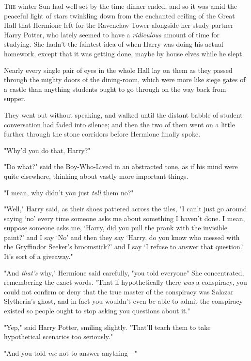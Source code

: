 
\lettrine{T}{he} winter Sun
had well set by the time dinner ended, and so it was amid the peaceful light of
stars twinkling down from the enchanted ceiling of the Great Hall that Hermione
left for the Ravenclaw Tower alongside her study partner Harry Potter, who
lately seemed to have a \emph{ridiculous} amount of time for studying. She
hadn't the faintest idea of when Harry was doing his actual homework, except
that it was getting done, maybe by house elves while he slept.

Nearly every single pair of eyes in the whole Hall lay on them as they passed
through the mighty doors of the dining-room, which were more like siege gates
of a castle than anything students ought to go through on the way back from
supper.

They went out without speaking, and walked until the distant babble of student
conversation had faded into silence; and then the two of them went on a little
further through the stone corridors before Hermione finally spoke.

"Why'd you do that, Harry?"

"Do what?" said the Boy-Who-Lived in an abstracted tone, as if his mind were
quite elsewhere, thinking about vastly more important things.

"I mean, why didn't you just \emph{tell} them no?"

"Well," Harry said, as their shoes pattered across the tiles, "I can't just go
around saying `no' every time someone asks me about something I haven't done. I
mean, suppose someone asks me, `Harry, did you pull the prank with the
invisible paint?' and I say `No' and then they say `Harry, do you know who
messed with the Gryffindor Seeker's broomstick?' and I say `I refuse to answer
that question.' It's sort of a giveaway."

"And \emph{that's} why," Hermione said carefully, "you told everyone{\el}"
She concentrated, remembering the exact words. "That if hypothetically there
\emph{was} a conspiracy, you could not confirm or deny that the true master of
the conspiracy was Salazar Slytherin's ghost, and in fact you wouldn't even be
able to admit the conspiracy existed so people ought to stop asking you
questions about it."

"Yep," said Harry Potter, smiling slightly. "That'll teach them to take
hypothetical scenarios too seriously."

"And you told \emph{me} not to answer anything\mbox{---}"

